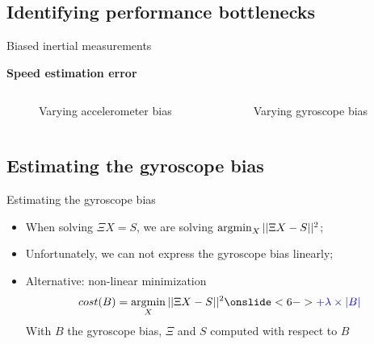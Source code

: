 \documentclass{beamer}
\newcommand{\argmin}{\operatornamewithlimits{argmin}}
\begin{document}
\subsection{Identifying performance bottlenecks}
\begin{frame}{Biased inertial measurements}

  \begin{center}
    \textbf{Speed estimation error}
  \end{center}

  \begin{columns}[T]
    \begin{figure}[h!]
      \centering
      \resizebox{0.85\textwidth}{!}{}
      \caption{Varying accelerometer bias}
    \end{figure}
    \begin{figure}[h!]
      \centering
      \resizebox{0.85\textwidth}{!}{}
      \caption{Varying gyroscope bias}
    \end{figure}

  \end{columns}
\end{frame}

\subsection{Estimating the gyroscope bias}
\begin{frame}{Estimating the gyroscope bias}

  \begin{itemize}[<+->]
  \item When solving  $\Xi X = S$, we are solving $\argmin_X ||\Xi X - S||^2$;
  \item Unfortunately, we can not express the gyroscope bias linearly;
  \item Alternative: non-linear minimization
    \[
    cost(B) = \argmin_X ||\Xi X - S||^2 \onslide<6->{\textcolor{blue}{+ \lambda \times |B|}}
    \]
  {\tiny With $B$ the gyroscope bias, $\Xi$ and $S$ computed with respect to $B$}
  \end{itemize}

  \begin{figure}[h!]
    \centering
      \begin{subfigure}[b]{0.47\textwidth}
        \resizebox{\textwidth}{!}{}
      \end{subfigure}
  \end{figure}

\end{frame}
\end{document}
